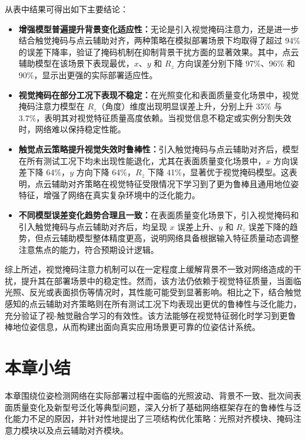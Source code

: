 \documentclass{Diploma}
\begin{document}
从表中结果可得出如下主要结论：

\begin{itemize}
  \item \textbf{增强模型普遍提升背景变化适应性：}无论是引入视觉掩码注意力，还是进一步结合触觉掩码与点云辅助对齐，两种策略在模拟部署场景下均取得了超过 94\% 的误差下降率，验证了掩码机制在抑制背景干扰方面的显著效果。其中，点云辅助模型在该场景下表现最优，$x$、$y$ 和 $R_z$ 方向误差分别下降 97\%、96\% 和 90\%，显示出更强的实际部署适应性。

  \item \textbf{视觉掩码在部分工况下表现不稳定：}在光照变化和表面质量变化场景中，视觉掩码注意力模型在 $R_z$（角度）维度出现明显误差上升，分别上升 35\% 与 3.7\%，表明其对视觉特征质量高度依赖。当视觉信息不稳定或实例分割失效时，网络难以保持稳定性能。

  \item \textbf{触觉点云策略提升视觉失效时鲁棒性：}引入触觉掩码与点云辅助对齐后，模型在所有测试工况下均未出现性能退化，尤其在表面质量变化场景中，$x$ 方向误差下降 64\%，$y$ 方向下降 64\%，$R_z$ 下降 41\%，显著优于视觉掩码模型。这表明，点云辅助对齐策略在视觉特征受限情况下学习到了更为鲁棒且通用地位姿特征，增强了网络在真实复杂环境中的泛化能力。

  \item \textbf{不同模型误差变化趋势合理且一致：}在表面质量变化场景下，引入视觉掩码和引入触觉掩码与点云辅助对齐后，均呈现 $x$ 误差上升、$y$ 和 $R_z$ 误差下降的趋势，但点云辅助模型整体精度更高，说明网络具备根据输入特征质量动态调整注意焦点的能力，符合预期设计逻辑。
\end{itemize}

综上所述，视觉掩码注意力机制可以在一定程度上缓解背景不一致对网络造成的干扰，提升其在部署场景中的稳定性。然而，该方法仍依赖于视觉特征质量，当面临光照、反光或表面损伤等情况时，其性能可能受到显著影响。相比之下，结合触觉感知的点云辅助对齐策略则在所有测试工况下均表现出更优的鲁棒性与泛化能力，充分验证了视-触觉融合学习的有效性。该方法能够在视觉特征弱化时学习到更鲁棒地位姿信息，从而构建出面向真实应用场景更可靠的位姿估计系统。


\section{本章小结}
本章围绕位姿检测网络在实际部署过程中面临的光照波动、背景不一致、批次间表面质量变化及新型号泛化等典型问题，深入分析了基础网络框架存在的鲁棒性与泛化能力不足的原因，并针对性地提出了三项结构优化策略：光照对齐模块、掩码注意力模块以及点云辅助对齐模块。
\end{document}
